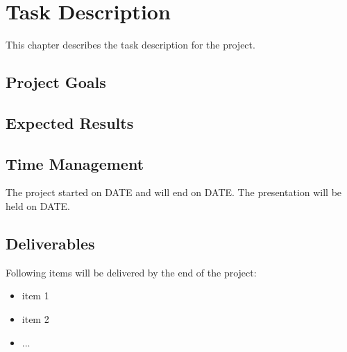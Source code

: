 \chapter{Task Description}
This chapter describes the task description for the project.

\section{Project Goals} 
\label{sec:project_goals}

\section{Expected Results}


\section{Time Management}
The project started on DATE and will end on DATE. The presentation will be held on DATE.

\section{Deliverables}
Following items will be delivered by the end of the project:

\begin{itemize}
\item item 1
\item item 2
\item ...
\end{itemize}